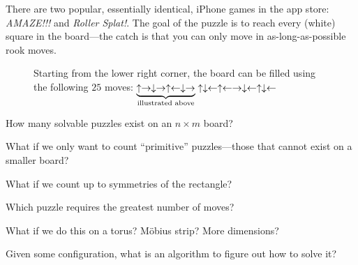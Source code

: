 \documentclass{article}
\begin{document}
There are two popular, essentially identical, iPhone games in the app store:
\textit{AMAZE!!!} and \textit{Roller Splat!}.
The goal of the puzzle is to reach every (white) square in the board---the catch
is that you can only move in as-long-as-possible rook moves.
\begin{figure}[ht!]
  \centering
  \caption{
    Starting from the lower right corner, the board can be filled using the following $25$ moves: $
      \protect\underbrace{
        \uparrow\rightarrow\downarrow\rightarrow\uparrow\leftarrow\downarrow\rightarrow
      }_\text{illustrated above}
      \uparrow\downarrow\leftarrow\uparrow\leftarrow\rightarrow\downarrow\leftarrow\uparrow\downarrow\leftarrow
    $
  }
\end{figure}

\begin{question}
  How many solvable puzzles exist on an $n \times m$ board?
\end{question}

\begin{related}
  \item What if we only want to count ``primitive'' puzzles---those that cannot
  exist on a smaller board?
  \item What if we count up to symmetries of the rectangle?
  \item Which puzzle requires the greatest number of moves?
  \item What if we do this on a torus? M\"obius strip? More dimensions?
  \item Given some configuration, what is an algorithm to figure out how to solve it?
\end{related}
\end{document}
